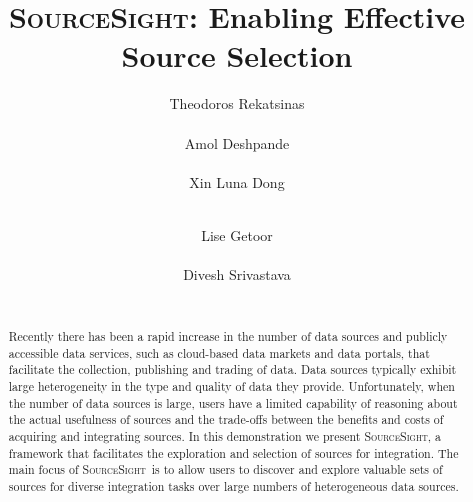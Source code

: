 \documentclass{vldb}
\newcommand\system{\textsc{SourceSight}}
\begin{document}

\title{{\LARGE \system}: Enabling Effective Source Selection}


\author{
\alignauthor
Theodoros Rekatsinas\\
       \\
\alignauthor
Amol Deshpande\\
       \\
\alignauthor 
Xin Luna Dong\\
       \\
\and  %
\alignauthor 
Lise Getoor\\
       \\
\alignauthor Divesh Srivastava\\
       \\
}

\maketitle

\begin{abstract}
Recently there has been a rapid increase in the number of data sources and publicly accessible data services, such as cloud-based data markets and data portals, that facilitate the collection, publishing and trading of data. Data sources typically exhibit large heterogeneity in the type and quality of data they provide. Unfortunately, when the number of data sources is large, users have a limited capability of reasoning about the actual usefulness of sources and the trade-offs between the benefits and costs of acquiring and integrating sources. In this demonstration we present \system, a framework that facilitates the exploration and selection of sources for integration. The main focus of \system~is to allow users to discover and explore valuable sets of sources for diverse integration tasks over large numbers of heterogeneous data sources.
\end{abstract}
\end{document}
